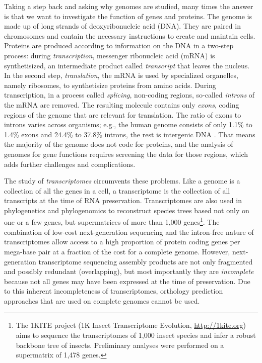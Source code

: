 Taking a step back and asking why genomes are studied, many times the answer is
that we want to investigate the function of genes and proteins. The genome is
made up of long strands of deoxyribonucleic acid (DNA). They are paired in
chromosomes and contain the necessary instructions to create and maintain cells.
Proteins are produced according to information on the DNA in a two-step process:
during \emph{transcription}, messenger ribonucleic acid (mRNA) is synthetisized,
an intermediate product called \emph{transcript} that leaves the nucleus. In the
second step, \emph{translation}, the mRNA is used by specialized organelles,
namely ribosomes, to synthetisize proteins from amino acids. During
transcription, in a process called \emph{splicing}, non-coding regions,
so-called \emph{introns} of the mRNA are removed. The resulting molecule
contains only \emph{exons}, coding regions of the genome that are relevant for
translation. The ratio of exons to introns varies across organisms; e.g., the
human genome consists of only 1.1\% to 1.4\% exons and 24.4\% to 37.8\% introns,
the rest is intergenic DNA \citep{venter2001}. That means the majority of the
genome does not code for proteins, and the analysis of genomes for gene
functions requires screening the data for those regions, which adds further
challenges and complications.

The study of \emph{transcriptomes} circumvents these problems. Like a genome is
a collection of all the genes in a cell, a transcriptome is the collection of
all transcripts at the time of RNA preservation. Transcriptomes are also used in
phylogenetics and phylogenomics to reconstruct species trees based not only on
one or a few genes, but supermatrices of more than 1,000 genes\footnote{The
1KITE project (1K Insect Transcriptome Evolution, \url{http://1kite.org}) aims
to sequence the transcriptomes of 1,000 insect species and infer a robust
backbone tree of insects. Preliminary analyses were performed on a supermatrix
of 1,478 genes.}. The combination of low-cost next-generation sequencing and the
intron-free nature of transcriptomes allow access to a high proportion of
protein coding genes per mega-base pair at a fraction of the cost for a complete
genome. However, next-generation transcriptome sequencing assembly products are
not only fragmented and possibly redundant (overlapping), but most importantly
they are \emph{incomplete} because not all genes may have been expressed at the
time of preservation. Due to this inherent incompleteness of transcriptomes,
orthology prediction approaches that are used on complete genomes cannot be
used.


